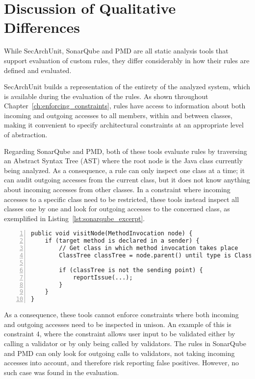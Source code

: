 


\section{Discussion of Qualitative Differences}
While SecArchUnit, SonarQube and PMD are all static analysis tools that support evaluation of custom rules, they differ considerably in how their rules are defined and evaluated.

SecArchUnit builds a representation of the entirety of the analyzed system, which is available during the evaluation of the rules. As shown throughout Chapter~\ref{ch:enforcing_constraints}, rules have access to information about both incoming and outgoing accesses to all members, within and between classes, making it convenient to specify architectural constraints at an appropriate level of abstraction.

Regarding SonarQube and PMD, both of these tools evaluate rules by traversing an Abstract Syntax Tree (AST) where the root node is the Java class currently being analyzed. As a consequence, a rule can only inspect one class at a time; it can audit outgoing accesses from the current class, but it does not know anything about incoming accesses from other classes. In a constraint where incoming accesses to a specific class need to be restricted, these tools instead inspect all classes one by one and look for outgoing accesses to the concerned class, as exemplified in Listing~\ref{lst:sonarqube_excerpt}. 

\begin{lstlisting}[caption={Excerpt of constraint 3 in SonarQube, simplified using pseudo code. See full rule definition in Appendix~\ref{apx:sonarqube} and the related PMD rule in Appendix~\ref{apx:pmd}.}, captionpos=b, label=lst:sonarqube_excerpt, numbers=left, showstringspaces=false]
public void visitNode(MethodInvocation node) {
    if (target method is declared in a sender) {
        // Get class in which method invocation takes place
        ClassTree classTree = node.parent() until type is ClassTree

        if (classTree is not the sending point) {
            reportIssue(...);
        }
    }
}
\end{lstlisting}

As a consequence, these tools cannot enforce constraints where both incoming and outgoing accesses need to be inspected in unison. An example of this is constraint 4, where the constraint allows user input to be validated either by calling a validator or by only being called by validators. The rules in SonarQube and PMD can only look for outgoing calls to validators, not taking incoming accesses into account, and therefore risk reporting false positives. However, no such case was found in the evaluation.

